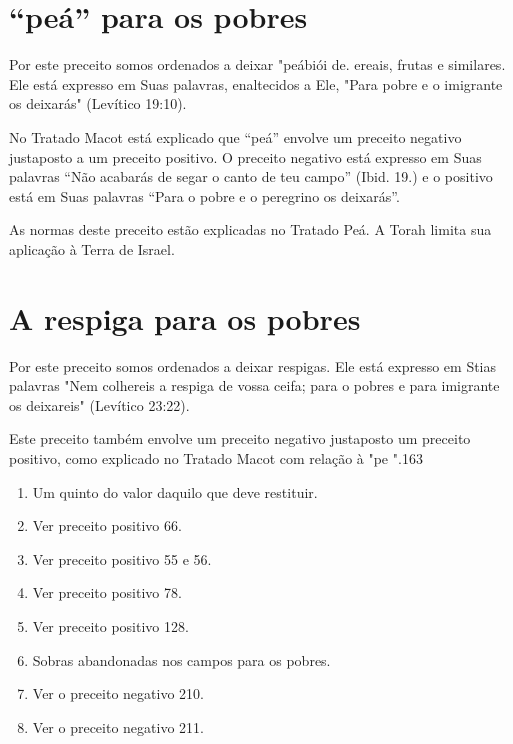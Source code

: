 \section{``peá'' para os pobres}

Por este preceito somos ordenados a deixar "peábiói
de. ereais, fru­tas e similares. Ele está expresso em
Suas palavras, enaltecidos a Ele, "Para
 pobre e o imigrante os deixarás" (Levítico 19:10).

No Tratado Macot está explicado que ``peá'' envolve um preceito negativo
justaposto a um preceito positivo. O preceito negativo está expresso
em Suas palavras ``Não acabarás de segar o canto de teu campo'' (Ibid. 19.)
e o positivo está em Suas palavras ``Para o pobre e o peregrino os deixarás''.

As normas deste preceito estão explicadas no Tratado Peá. A Torah
limita sua aplicação à Terra de Israel.


\section{A respiga para os pobres}

Por este preceito somos ordenados a deixar respigas. Ele está expresso
em Stias palavras "Nem colhereis a respiga de vossa ceifa; para o pobres
e para
 imigrante os deixareis" (Levítico 23:22).


Este preceito também envolve um preceito negativo justaposto um preceito
positivo, como explicado no Tratado Macot com relação à "pe ".163


\begin{enumerate}
\def\labelenumi{\arabic{enumi}.}
\setcounter{enumi}{155}
\item
 
 Um quinto do valor daquilo que deve restituir.
 
\item
 
 Ver preceito positivo 66.
 
\item
 
 Ver preceito positivo 55 e 56.
 
\item
 
 Ver preceito positivo 78.
 
\item
 
 Ver preceito positivo 128.
 
\item
 
 Sobras abandonadas nos campos para os pobres.
 
\item
 
 Ver o preceito negativo 210.
 
\item
 
 Ver o preceito negativo 211.
 
\end{enumerate}

